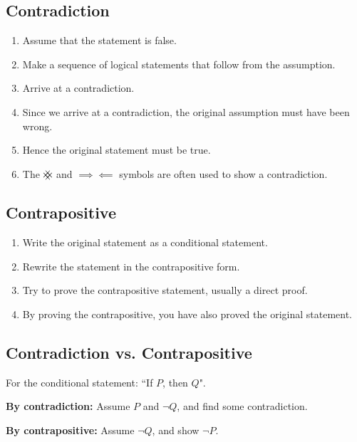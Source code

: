 \documentclass{article}
\newcommand{\contradiction}{
    \hspace{-1em}
	{\hbox{
	\setbox0=\hbox{$\mkern-3mu{\times}\mkern-3mu$}
	\setbox1=\hbox to0pt{\hss\copy0\hss}
	\copy0\raisebox{0.5\wd0}{\copy1}\raisebox{-0.5\wd0}{\box1}\box0}}
}
\theoremstyle{plain}
\numberwithin{theorem}{subsection}
\theoremstyle{definition}
\numberwithin{definition}{subsection}
\theoremstyle{remark}
\numberwithin{note}{subsection}
\begin{document}
\subsection{Contradiction}
\begin{enumerate}
    \item Assume that the statement is false.
    \item Make a sequence of logical statements that follow from the assumption.
    \item Arrive at a contradiction.
    \item Since we arrive at a contradiction, the original assumption must have been wrong.
    \item Hence the original statement must be true.
    \item The $\contradiction$ and $\implies\!\!\!\!\impliedby$ symbols
            are often used to show a contradiction.
\end{enumerate}
%
\subsection{Contrapositive}
\begin{enumerate}
    \item Write the original statement as a conditional statement.
    \item Rewrite the statement in the contrapositive form.
    \item Try to prove the contrapositive statement, usually a direct proof.
    \item By proving the contrapositive, you have also proved the original statement.
\end{enumerate}
%
\subsection{Contradiction vs. Contrapositive}
For the conditional statement: ``If $P$, then $Q$".

\textbf{By contradiction:} Assume $P$ and $\neg{Q}$, and find some contradiction.

\textbf{By contrapositive:} Assume $\neg{Q}$, and show $\neg{P}$.
%
\end{document}
